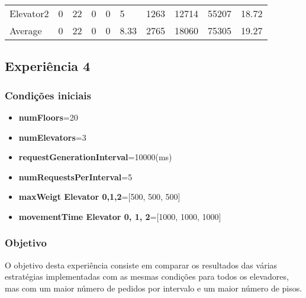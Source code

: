 \documentclass[a4paper]{article}
\begin{document}
\begin{table}[h]
\begin{tabular}{@{}llllllllll@{}}
Elevator2 & 0        & 22            & 0           & 0                                                               & 5                                                                  & 1263                                                         & 12714                                                 & 55207                                                   & 18.72         \\
Average   & 0     & 22         & 0        & 0                                                               & 8.33                                                               & 2765                                                         & 18060                                                 &  75305                                                  & 19.27         \\ \bottomrule
\end{tabular}
\end{table}

\subsection{Experiência 4}

\subsubsection{Condições iniciais}

\begin{itemize}
\item \textbf{numFloors}=20
\item \textbf{numElevators}=3
\item \textbf{requestGenerationInterval}=10000(ms)
\item \textbf{numRequestsPerInterval}=5
\item \textbf{maxWeigt Elevator 0,1,2}=[500, 500, 500]
\item \textbf{movementTime Elevator 0, 1, 2}=[1000, 1000, 1000]
\end{itemize}

\subsubsection{Objetivo} 

O objetivo desta experiência consiste em comparar os resultados das várias estratégias implementadas com as mesmas condições para todos os elevadores, mas com um maior número de pedidos por intervalo e um maior número de pisos.
\end{document}

